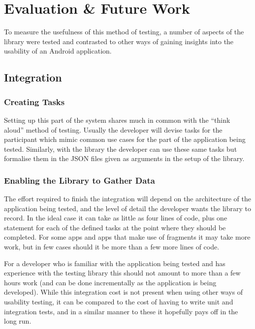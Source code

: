 \chapter{Evaluation \& Future Work}

To measure the usefulness of this method of testing, a number of
aspects of the library were tested and contrasted to other ways of
gaining insights into the usability of an Android application.

\section{Integration}

\subsection{Creating Tasks}

Setting up this part of the system shares much in common with the
``think aloud'' method of testing.  Usually the developer will
devise tasks for the participant which mimic common use cases for
the part of the application being tested. Similarly, with the library
the developer can use these same tasks but formalise them in the
JSON files given as arguments in the setup of the library.

\subsection{Enabling the Library to Gather Data}

The effort required to finish the integration will depend on the
architecture of the application being tested, and the level of
detail the developer wants the library to record. In the ideal case
it can take as little as four
lines of code, plus one statement for each of the defined tasks at
the point where they should be completed. For some apps and apps
that make use of fragments it may take more work, but in few cases
should it be more than a few more lines of code.

For a developer who is familiar with the application being tested
and has experience with the testing library this should not amount
to more than a few hours work (and can be done incrementally as the
application is being developed). While this integration cost is not
present when using other ways of usability testing, it can be
compared to the cost of having to write unit and integration tests,
and in a similar manner to these it hopefully pays off in the long
run.


